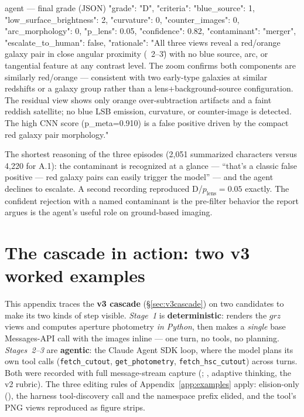 \documentclass[11pt,letterpaper]{article}
\newcommand{\plens}{\ensuremath{p_{\mathrm{lens}}}}
\begin{document}
\begin{toolio}{agent --- final grade (JSON)}
{
  "grade": "D",
  "criteria": {"blue_source": 1, "low_surface_brightness": 2, "curvature": 0,
               "counter_images": 0, "arc_morphology": 0},
  "p_lens": 0.05,
  "confidence": 0.82,
  "contaminant": "merger",
  "escalate_to_human": false,
  "rationale": "All three views reveal a red/orange galaxy pair in close angular proximity (~2–3\") with no blue source, arc, or tangential feature at any contrast level. The zoom confirms both components are similarly red/orange — consistent with two early-type galaxies at similar redshifts or a galaxy group rather than a lens+background-source configuration. The residual view shows only orange over-subtraction artifacts and a faint reddish satellite; no blue LSB emission, curvature, or counter-image is detected. The high CNN score (p_meta=0.910) is a false positive driven by the compact red galaxy pair morphology."
}
\end{toolio}

The shortest reasoning of the three episodes (2{,}051 summarized characters versus
4{,}220 for A.1): the contaminant is recognized at a glance --- ``that's a classic
false positive --- red galaxy pairs can easily trigger the model'' --- and the agent
declines to escalate. A second recording reproduced D/$\plens=0.05$ exactly. The
confident rejection with a named contaminant is the pre-filter behavior the report
argues is the agent's useful role on ground-based imaging.

\section{The cascade in action: two v3 worked examples}
\label{app:v3examples}

This appendix traces the \textbf{v3 cascade} (\S\ref{sec:v3cascade}) on two candidates to make its
two kinds of step visible. \emph{Stage~1} is \textbf{deterministic}:  renders
the $grz$ views and computes aperture photometry \emph{in Python}, then makes a \emph{single} base
Messages-API call with the images inline --- one turn, no tools, no planning. \emph{Stages~2--3} are
\textbf{agentic}: the Claude Agent SDK loop, where the model plans its own tool calls
(\texttt{fetch\_cutout}, \texttt{get\_photometry}, \texttt{fetch\_hsc\_cutout}) across turns. Both
were recorded with full message-stream capture (; ,
adaptive thinking, the v2 rubric). The three editing rules of Appendix~\ref{app:examples} apply:
elision-only (\code{[...]}), the harness  tool-discovery call and the
 namespace prefix elided, and the tool's PNG views reproduced as figure strips.
\end{document}
